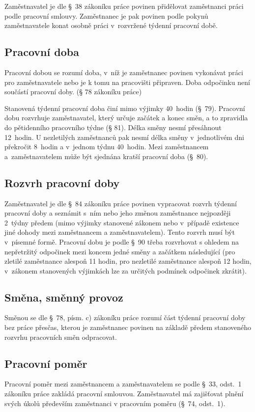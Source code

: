 \documentclass[twoside]{ctuthesis}
\begin{document}
Zaměstnavatel je dle §~38 zákoníku práce povinen přidělovat zaměstnanci práci podle pracovní smlouvy. Zaměstnanec je pak povinen podle pokynů zaměstnavatele konat osobně práci v~rozvržené týdenní pracovní době.

\subsection{Pracovní doba}
Pracovní dobou se rozumí doba, v~níž je zaměstnanec povinen vykonávat práci pro zaměstnavatele nebo je k tomu na pracovišti připraven. Doba odpočinku není součástí pracovní doby. (§ 78 zákoníku práce)

Stanovená týdenní pracovní doba činí mimo výjimky 40~hodin (§~79). Pracovní dobu rozvrhuje zaměstnavatel, který určuje začátek a konec směn, a to zpravidla do pětidenního pracovního týdne (§ 81). Délka směny nesmí přesáhnout 12~hodin. U nezletilých zaměstnanců pak nesmí délka směny v~jednotlivém dni překročit 8~hodin a v~jednom týdnu 40~hodin. Mezi zaměstnancem a~zaměstnavatelem může být sjednána kratší pracovní doba (§~80).

\subsection{Rozvrh pracovní doby}
Zaměstnavatel je dle §~84 zákoníku práce povinen vypracovat rozvrh týdenní pracovní doby a seznámit s~ním nebo jeho změnou zaměstnance nejpozději 2~týdny předem (mimo výjimky stanovené zákonem nebo v~případě existence jiné dohody mezi zaměstnancem a zaměstnavatelem). Tento rozvrh musí být v~písemné formě. Pracovní dobu je podle §~90 třeba rozvrhovat s ohledem na nepřetržitý odpočinek mezi koncem jedné směny a začátkem následující (pro zletilé zaměstnance alespoň 11 hodin, pro nezletilé zaměstnance alespoň 12 hodin, v~zákonem stanovených výjimkách lze za určitých podmínek odpočinek zkrátit).

\subsection{Směna, směnný provoz}
Směnou se dle §~78, písm. c) zákoníku práce rozumí část týdenní pracovní doby bez práce přesčas, kterou je zaměstnanec povinen na základě předem stanoveného rozvrhu pracovních směn odpracovat.

\subsection{Pracovní poměr}
Pracovní poměr mezi zaměstnancem a zaměstnavatelem se podle §~33, odst.~1 zákoníku práce zakládá pracovní smlouvou. Zaměstnavatel má zajišťovat plnění svých úkolů především zaměstnanci v pracovním poměru (§~74, odst.~1).
\end{document}
